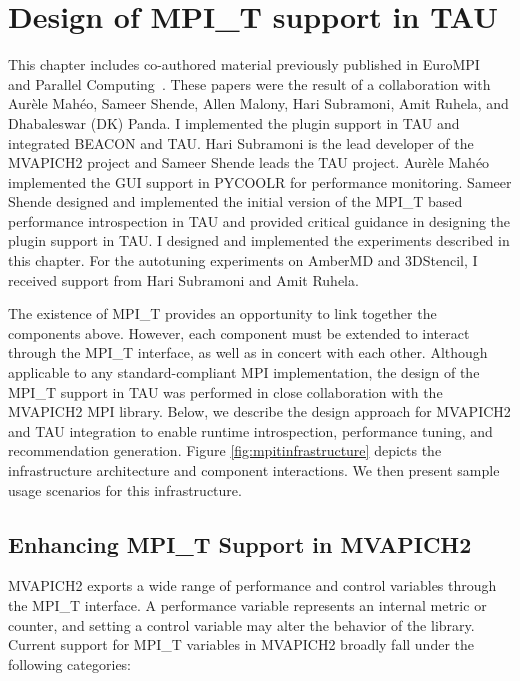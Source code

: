 \chapter{Design of MPI\_T support in TAU}
This chapter includes co-authored material previously published in EuroMPI~\cite{EuroMPI} and Parallel Computing~\cite{ParCo}. These papers were the result of a collaboration with Aur\`{e}le Mah\'{e}o, Sameer Shende, Allen Malony, Hari Subramoni, Amit Ruhela, and Dhabaleswar (DK) Panda. I implemented the plugin support in TAU and integrated BEACON and TAU. Hari Subramoni is the lead developer of the MVAPICH2 project and Sameer Shende leads the TAU project. Aur\`{e}le Mah\'{e}o implemented the GUI support in PYCOOLR for performance monitoring. Sameer Shende designed and implemented the initial version of the MPI\_T based performance introspection in TAU and provided critical guidance in designing the plugin support in TAU. I designed and implemented the experiments described in this chapter. For the autotuning experiments on AmberMD and 3DStencil, I received support from Hari Subramoni and Amit Ruhela. 
\par The existence of MPI\_T provides an opportunity to link together the components above. However, each component must be extended to interact through the MPI\_T interface, as well as in concert with each other. Although applicable to any standard-compliant MPI implementation, the design of the MPI\_T support in TAU was performed in close collaboration with the MVAPICH2 MPI library. Below, we describe the design approach for MVAPICH2 and TAU integration to enable runtime introspection, performance tuning, and recommendation generation. Figure \ref{fig:mpitinfrastructure} depicts the infrastructure architecture and component interactions. We then present sample usage scenarios for this infrastructure. 
\section {Enhancing MPI\_T Support in MVAPICH2}
MVAPICH2 exports a wide range of performance and control variables through the MPI\_T interface. A performance variable represents an internal metric or counter, and setting a control variable may alter the behavior of the library. Current support for MPI\_T variables in MVAPICH2 broadly fall under the following categories:

